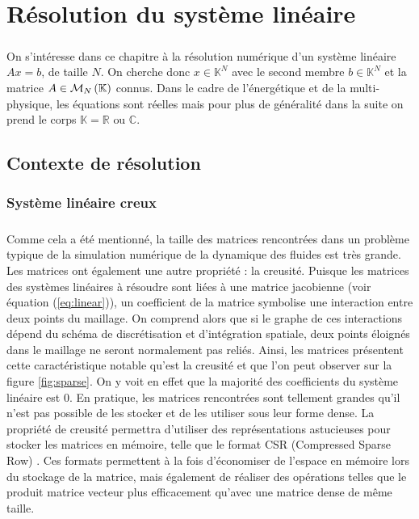 \chapter{Résolution du système linéaire}

\paragraph{}
On s'intéresse dans ce chapitre à la résolution numérique d'un système linéaire $Ax = b$, de taille $N$.
On cherche donc $x\in\mathbb{K}^N$ avec le second membre $b\in\mathbb{K}^N$ et la matrice $A\in\mathcal{M}_{N}\left(\mathbb{K}\right)$ connus.
Dans le cadre de l'énergétique et de la multi-physique, les équations sont réelles mais pour plus de généralité dans la suite on prend le corps $\mathbb{K} = \mathbb{R}\textrm{ ou }\mathbb{C}$.


\section{Contexte de résolution}

  \subsection{Système linéaire creux}

    \paragraph{}
		Comme cela a été mentionné, la taille des matrices rencontrées dans un problème typique de la simulation numérique de la dynamique des fluides est très grande.
		Les matrices ont également une autre propriété : la creusité.
		Puisque les matrices des systèmes linéaires à résoudre sont liées à une matrice jacobienne (voir équation (\ref{eq:linear})), un coefficient de la matrice symbolise une interaction entre deux points du maillage.
		On comprend alors que si le graphe de ces interactions dépend du schéma de discrétisation et d'intégration spatiale, deux points éloignés dans le maillage ne seront normalement pas reliés.
		Ainsi, les matrices présentent cette caractéristique notable qu'est la creusité et que l'on peut observer sur la figure \ref{fig:sparse}.
		On y voit en effet que la majorité des coefficients du système linéaire est 0.
		En pratique, les matrices rencontrées sont tellement grandes qu'il n'est pas possible de les stocker et de les utiliser sous leur forme dense.
		La propriété de creusité permettra d'utiliser des représentations astucieuses pour stocker les matrices en mémoire, telle que le format CSR (Compressed Sparse Row) \cite{Saad2003}.
		Ces formats permettent à la fois d'économiser de l'espace en mémoire lors du stockage de la matrice, mais également de réaliser des opérations telles que le produit matrice vecteur plus efficacement qu'avec une matrice dense de même taille.

